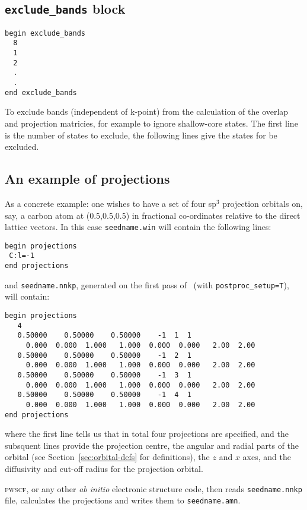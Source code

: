 \subsection{{\tt exclude\_bands} block}
\begin{verbatim}
begin exclude_bands 
  8 
  1 
  2 
  .
  .
end exclude_bands
\end{verbatim}
To exclude bands (independent of k-point) from the calculation of the 
overlap and projection matricies, for example to ignore shallow-core states.
The first line is the number of states to exclude, the following lines give
the states for be excluded.


\subsection{An example of projections}\label{sec:proj_example}

As a concrete example: one wishes to have a set of four sp$^3$ projection
orbitals on, say, a carbon atom at (0.5,0.5,0.5) in fractional
co-ordinates relative to the direct lattice vectors. In this case
\verb#seedname.win# will contain the following lines:

\begin{verbatim}
begin projections
 C:l=-1
end projections
\end{verbatim}

and \verb#seedname.nnkp#, generated on the first pass of
\wannier\ (with \verb#postproc_setup=T#), will contain: 

\begin{verbatim}
begin projections
   4
   0.50000    0.50000    0.50000    -1  1  1
     0.000  0.000  1.000   1.000  0.000  0.000   2.00  2.00
   0.50000    0.50000    0.50000    -1  2  1
     0.000  0.000  1.000   1.000  0.000  0.000   2.00  2.00
   0.50000    0.50000    0.50000    -1  3  1
     0.000  0.000  1.000   1.000  0.000  0.000   2.00  2.00
   0.50000    0.50000    0.50000    -1  4  1
     0.000  0.000  1.000   1.000  0.000  0.000   2.00  2.00
end projections
\end{verbatim}

where the first line tells us that in total four projections are
specified, and the subsquent lines provide the projection centre, the
angular and radial parts of the orbital (see
Section~\ref{sec:orbital-defs} for definitions), the $z$ and $x$ axes,
and the diffusivity and cut-off radius for the projection orbital.

\textsc{pwscf}, or any other \textit{ab initio} electronic structure
code, then reads \verb#seedname.nnkp# file, calculates the projections
and writes them to \verb#seedname.amn#. 





